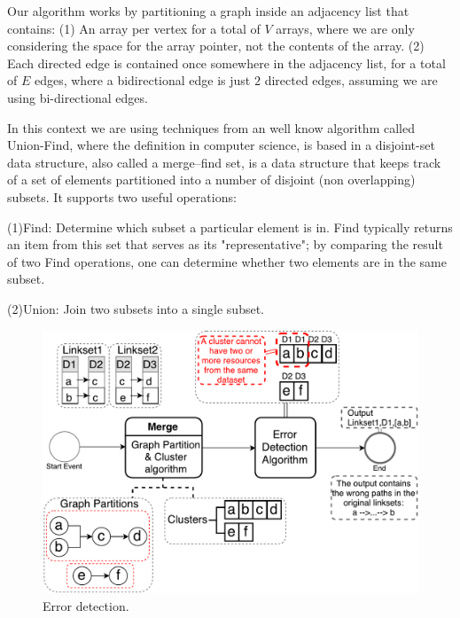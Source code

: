 Our algorithm works by partitioning a graph inside an adjacency list that contains: (1) An array per vertex for a total of $V$ arrays, where we are only considering the space for the array pointer, not the contents of the array. (2) Each directed edge is contained once somewhere in the adjacency list, for a total of $E$ edges, where a bidirectional edge is just $2$ directed edges, assuming we are using bi-directional edges. 

In this context we are using techniques from an well know algorithm called Union-Find, where the definition in computer science, is based in a disjoint-set data structure, also called a merge–find set, is a data structure that keeps track of a set of elements partitioned into a number of disjoint (non overlapping) subsets. It supports two useful operations:

(1)Find: Determine which subset a particular element is in. Find typically returns an item from this set that serves as its "representative"; by comparing the result of two Find operations, one can determine whether two elements are in the same subset.

(2)Union: Join two subsets into a single subset.




\begin{figure}[htb] 
	\centering
	\includegraphics[width=0.86\linewidth]{img/errorDetection8.pdf}
	\caption{Error detection.}
	\label{fig:ErrorDetection}
\end{figure} 

